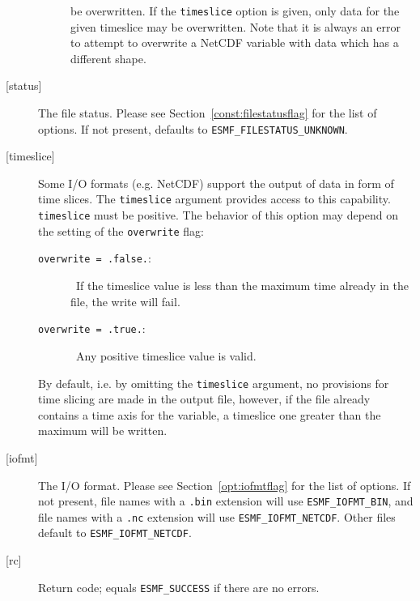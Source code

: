 \begin{description}
\begin{sloppypar}
\begin{description}
   be overwritten. If the {\tt timeslice} option is given, only data for
   the given timeslice may be overwritten.
   Note that it is always an error to attempt to overwrite a NetCDF
   variable with data which has a different shape.
   \end{description}
   \end{sloppypar}
   \item[{[status]}]
   \begin{sloppypar}
   The file status. Please see Section~\ref{const:filestatusflag} for
   the list of options. If not present, defaults to
   {\tt ESMF\_FILESTATUS\_UNKNOWN}.
   \end{sloppypar}
   \item[{[timeslice]}]
   \begin{sloppypar}
   Some I/O formats (e.g. NetCDF) support the output of data in form of
   time slices. The {\tt timeslice} argument provides access to this
   capability. {\tt timeslice} must be positive. The behavior of this
   option may depend on the setting of the {\tt overwrite} flag:
   \begin{description}
   \item[{\tt overwrite = .false.}:]\ If the timeslice value is
   less than the maximum time already in the file, the write will fail.
   \item[{\tt overwrite = .true.}:]\ Any positive timeslice value is valid.
   \end{description}
   By default, i.e. by omitting the {\tt timeslice} argument, no
   provisions for time slicing are made in the output file,
   however, if the file already contains a time axis for the variable,
   a timeslice one greater than the maximum will be written.
   \end{sloppypar}
   \item[{[iofmt]}]
   \begin{sloppypar}
   The I/O format. Please see Section~\ref{opt:iofmtflag} for the list
   of options. If not present, file names with a {\tt .bin} extension will
   use {\tt ESMF\_IOFMT\_BIN}, and file names with a {\tt .nc} extension
   will use {\tt ESMF\_IOFMT\_NETCDF}. Other files default to
   {\tt ESMF\_IOFMT\_NETCDF}.
   \end{sloppypar}
   \item[{[rc]}]
   Return code; equals {\tt ESMF\_SUCCESS} if there are no errors.
   \end{description}
  
\setlength{\parskip}{\oldparskip}
\setlength{\parindent}{\oldparindent}
\setlength{\baselineskip}{\oldbaselineskip}
